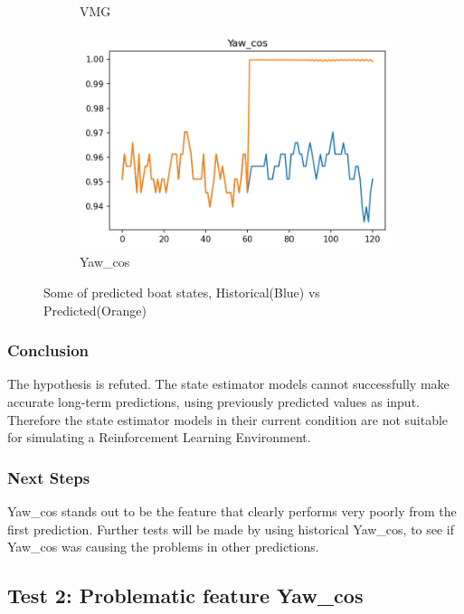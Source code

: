 \documentclass[12pt,twoside]{report}
\begin{document}
\begin{figure}[h]
\begin{subfigure}[b]{0.32\textwidth}
         \caption{VMG}
     \end{subfigure}
     \begin{subfigure}[b]{0.32\textwidth}
         \centering
         \includegraphics[width=\textwidth]{figures/prediction-plots/Yaw_cos.png}
         \caption{Yaw\_cos}
     \end{subfigure}
        \caption{Some of predicted boat states, Historical(Blue) vs Predicted(Orange)}
        \label{fig:prediction-boat-states}
\end{figure}


\subsubsection{Conclusion}
The hypothesis is refuted. The state estimator models cannot successfully make accurate long-term predictions, using previously predicted values as input. Therefore the state estimator models in their current condition are not suitable for simulating a Reinforcement Learning Environment.

\subsubsection{Next Steps}
Yaw\_cos stands out to be the feature that clearly performs very poorly from the first prediction. Further tests will be made by using historical Yaw\_cos, to see if Yaw\_cos was causing the problems in other predictions.

\subsection{Test 2: Problematic feature Yaw\_cos}
\end{document}
